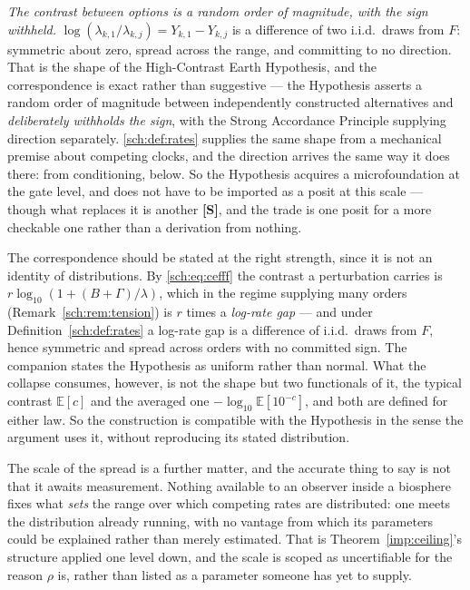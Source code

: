 \documentclass[11pt]{article}
\newcommand{\E}{\mathbb{E}}
\theoremstyle{plain}
\theoremstyle{definition}
\theoremstyle{remark}
\begin{document}
\emph{The contrast between options is a random order of magnitude, with
the sign withheld.} $\log(\lambda_{k,1}/\lambda_{k,j})=Y_{k,1}-Y_{k,j}$ is a
difference of two i.i.d.\ draws from $F$: symmetric about zero, spread
across the range, and committing to no direction. That is the shape of the High-Contrast
Earth Hypothesis, and the correspondence is exact rather than
suggestive --- the Hypothesis asserts a random order of magnitude between
independently constructed alternatives and \emph{deliberately withholds
the sign}, with the Strong Accordance Principle supplying direction
separately. \eqref{sch:def:rates} supplies the same shape from a
mechanical premise about competing clocks, and the direction arrives the
same way it does there: from conditioning, below. So the Hypothesis
acquires a microfoundation at the gate level, and does not have to be
imported as a posit at this scale --- though what replaces it is another
\textbf{[S]}, and the trade is one posit for a more checkable one rather
than a derivation from nothing.

The correspondence should be stated at the right strength, since it is
not an identity of distributions. By \eqref{sch:eq:cefff} the contrast a
perturbation carries is $r\log_{10}(1+(B+\Gamma)/\lambda)$, which in the
regime supplying many orders (Remark~\ref{sch:rem:tension}) is $r$ times
a \emph{log-rate gap} --- and under Definition~\ref{sch:def:rates} a
log-rate gap is a difference of i.i.d.\ draws from $F$, hence symmetric
and spread across orders with no committed sign. The companion states
the Hypothesis as uniform rather than normal. What the collapse
consumes, however, is not the shape but two functionals of it, the
typical contrast $\E[c]$ and the averaged one
$-\log_{10}\E[10^{-c}]$, and both are defined for either law. So the
construction is compatible with the Hypothesis in the sense the argument
uses it, without reproducing its stated distribution.

The scale of the spread is a further matter, and the accurate thing to say is not that it awaits measurement. Nothing available to an observer
inside a biosphere fixes what \emph{sets} the range over which competing
rates are distributed: one meets the distribution already running, with
no vantage from which its parameters could be explained rather than
merely estimated. That is Theorem~\ref{imp:ceiling}'s structure applied one
level down, and the scale is scoped as uncertifiable for the reason
$\rho$ is, rather than listed as a parameter someone has yet to
supply.
\end{document}
